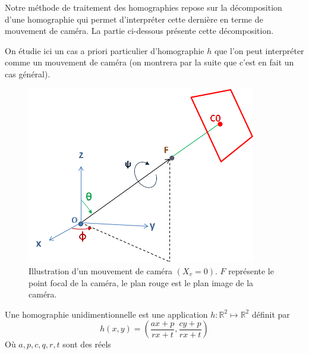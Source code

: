 

Notre méthode de traitement des homographies repose sur la décomposition d'une homographie qui permet d'interpréter cette dernière en terme de mouvement de caméra. La partie ci-dessous présente cette décomposition.





On étudie ici un cas a priori particulier d'homographie $h$   que l'on peut interpréter comme un mouvement de caméra (on montrera par la suite que c'est en fait un cas général).\\
\begin{figure}[h!]
\label{shmdecomp}
\centering
\includegraphics[width=10cm]{shema_decomp.png}

\caption{Illustration d'un mouvement de caméra $(X_v =0)$. $F$ représente le point focal de la caméra, le plan rouge est le plan image de la caméra.}
\end{figure}
\begin{Def}
Une homographie unidimentionnelle est une application $h:\mathbb{R}^{2} \mapsto \mathbb{R}^{2}$ définit par 
\begin{equation*}
h(x,y)=\left ( \frac{ax+p}{rx+t} , \frac{cy+p}{rx+t} \right)
\end{equation*}
Où $a,p,c,q,r,t$ sont des réels 
\end{Def}
